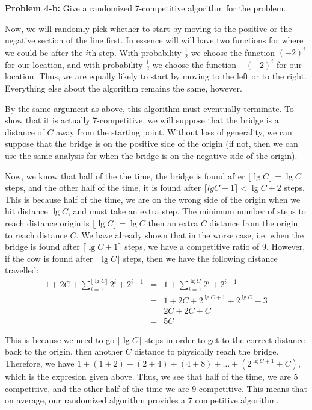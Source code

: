 \documentclass[psamsfonts]{amsart}
\newenvironment{sol}{\vspace{0.25cm}{\large \bfseries Solution:}}{\qedsymbol}
\newenvironment{prob}[1]{\begin{framed}{\large \bfseries Problem #1:}}{\end{framed}}
\begin{document}
\begin{prob}{4-b}
Give a randomized 7-competitive algorithm for the problem.
\end{prob}

\begin{sol}
Now, we will randomly pick whether to start by moving to the positive or the negative section of the line first. In essence will will have two functions for where we could be after the $i$th step. With probability $\frac{1}{2}$ we choose the function $(-2)^i$ for our location, and with probability $\frac{1}{2}$ we choose the function $-(-2)^i$ for our location. Thus, we are equally likely to start by moving to the left or to the right. Everything else about the algorithm remains the same, however. 

By the same argument as above, this algorithm must eventually terminate. To show that it is actually 7-competitive, we will suppose that the bridge is a distance of $C$ away from the starting point. Without loss of generality, we can suppose that the bridge is on the positive side of the origin (if not, then we can use the same analysis for when the bridge is on the negative side of the origin). 

Now, we know that half of the the time, the bridge is found after $\lfloor \lg C \rfloor = \lg C$ steps, and the other half of the time, it is found after $\lceil lg C + 1 \rceil < \lg C + 2$ steps. This is because half of the time, we are on the wrong side of the origin when we hit distance $\lg C$, and must take an extra step. The minimum number of steps to reach distance origin is $\lfloor \lg C \rfloor = \lg C$ then an extra $C$ distance from the origin to reach distance $C$. We have already shown that in the worse case, i.e. when the bridge is found after $\lceil \lg C + 1 \rceil$ steps, we have a competitive ratio of 9. However, if the cow is found after $\lfloor \lg C \rfloor$ steps, then we have the following distance travelled:
\begin{eqnarray}
1 + 2C + \sum_{i=1}^{\lfloor \lg C \rfloor} 2^{i} + 2^{i-1} &=& 1 + \sum_{i=1}^{\lg C} 2^{i} + 2^{i-1} \\
&=& 1 + 2C + 2^{\lg C + 1} + 2^{\lg C} - 3 \\
&=& 2C + 2C +C \\
&=& 5C
\end{eqnarray}

This is because we need to go $\lceil \lg C \rceil$ steps in order to get to the correct distance back to the origin, then another $C$ distance to physically reach the bridge. Therefore, we have $1+(1+2)+(2+4)+(4+8)+ \ldots + (2^{\lg C + 1} + C)$, which is the expresion given above. Thus, we see that half of the time, we are 5 competitive, and the other half of the time we are 9 competitive. This means that on average, our randomized algorithm provides a 7 competitive algorithm.
\end{sol}
\end{document}
